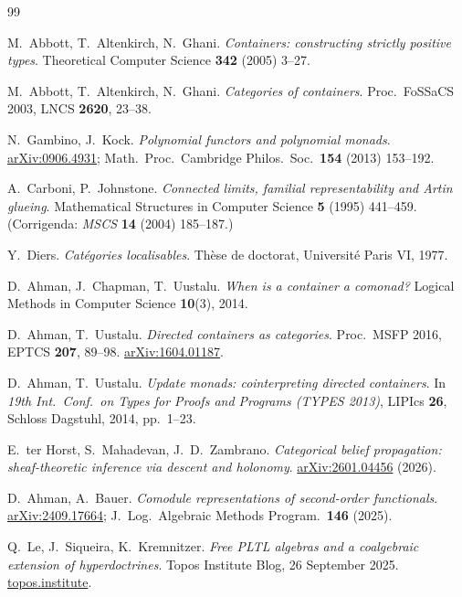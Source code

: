 \documentclass[11pt,a4paper]{book}
\theoremstyle{plain}
\theoremstyle{definition}
\theoremstyle{remark}
\begin{document}
\begin{thebibliography}{99}

 M.~Abbott, T.~Altenkirch, N.~Ghani.
\emph{Containers: constructing strictly positive types}.
Theoretical Computer Science \textbf{342} (2005) 3--27.

 M.~Abbott, T.~Altenkirch, N.~Ghani.
\emph{Categories of containers}.
Proc.\ FoSSaCS 2003, LNCS \textbf{2620}, 23--38.

 N.~Gambino, J.~Kock.
\emph{Polynomial functors and polynomial monads}.
\href{https://arxiv.org/abs/0906.4931}{arXiv:0906.4931};
Math.\ Proc.\ Cambridge Philos.\ Soc.\ \textbf{154} (2013) 153--192.

 A.~Carboni, P.~Johnstone.
\emph{Connected limits, familial representability and Artin glueing}.
Mathematical Structures in Computer Science \textbf{5} (1995) 441--459.
(Corrigenda: \emph{MSCS} \textbf{14} (2004) 185--187.)

 Y.~Diers.
\emph{Cat\'egories localisables}.
Th\`ese de doctorat, Universit\'e Paris VI, 1977.

 D.~Ahman, J.~Chapman, T.~Uustalu.
\emph{When is a container a comonad?}
Logical Methods in Computer Science \textbf{10}(3), 2014.

 D.~Ahman, T.~Uustalu.
\emph{Directed containers as categories}.
Proc.\ MSFP 2016, EPTCS \textbf{207}, 89--98.
\href{https://arxiv.org/abs/1604.01187}{arXiv:1604.01187}.

 D.~Ahman, T.~Uustalu.
\emph{Update monads: cointerpreting directed containers}.
In \emph{19th Int.\ Conf.\ on Types for Proofs and Programs (TYPES 2013)},
LIPIcs \textbf{26}, Schloss Dagstuhl, 2014, pp.\ 1--23.

 E.~ter Horst, S.~Mahadevan, J.~D.~Zambrano.
\emph{Categorical belief propagation: sheaf-theoretic inference via descent and holonomy}.
\href{https://arxiv.org/abs/2601.04456}{arXiv:2601.04456} (2026).

 D.~Ahman, A.~Bauer.
\emph{Comodule representations of second-order functionals}.
\href{https://arxiv.org/abs/2409.17664}{arXiv:2409.17664};
J.\ Log.\ Algebraic Methods Program.\ \textbf{146} (2025).

 Q.~Le, J.~Siqueira, K.~Kremnitzer.
\emph{Free PLTL algebras and a coalgebraic extension of hyperdoctrines}.
Topos Institute Blog, 26 September 2025.
\href{https://topos.institute/blog/2025-09-26-free-pltl-algebras-and-hyperdoctrines/}{topos.institute}.


\end{thebibliography}
\end{document}
